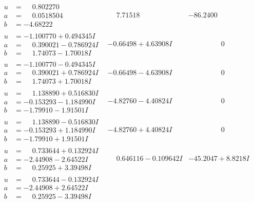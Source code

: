 \documentclass[1p]{elsarticle_modified}
\theoremstyle{definition}
\begin{document}
$$\begin{array}{c|c|c}
\begin{aligned}
u &= \phantom{-}0.802270\phantom{ +0.000000I} \\
a &= \phantom{-}0.0518504\phantom{ +0.000000I} \\
b &= -4.68222\phantom{ +0.000000I}\end{aligned}
 & \phantom{-}7.71518\phantom{ +0.000000I} & -86.2400\phantom{ +0.000000I} \\ \hline\begin{aligned}
u &= -1.100770 + 0.494345 I \\
a &= \phantom{-}0.390021 - 0.786924 I \\
b &= \phantom{-}1.74073 - 1.70018 I\end{aligned}
 & -0.66498 + 4.63908 I & \phantom{-0.000000 } 0 \\ \hline\begin{aligned}
u &= -1.100770 - 0.494345 I \\
a &= \phantom{-}0.390021 + 0.786924 I \\
b &= \phantom{-}1.74073 + 1.70018 I\end{aligned}
 & -0.66498 - 4.63908 I & \phantom{-0.000000 } 0 \\ \hline\begin{aligned}
u &= \phantom{-}1.138890 + 0.516830 I \\
a &= -0.153293 - 1.184990 I \\
b &= -1.79910 - 1.91501 I\end{aligned}
 & -4.82760 - 4.40824 I & \phantom{-0.000000 } 0 \\ \hline\begin{aligned}
u &= \phantom{-}1.138890 - 0.516830 I \\
a &= -0.153293 + 1.184990 I \\
b &= -1.79910 + 1.91501 I\end{aligned}
 & -4.82760 + 4.40824 I & \phantom{-0.000000 } 0 \\ \hline\begin{aligned}
u &= \phantom{-}0.733644 + 0.132924 I \\
a &= -2.44908 - 2.64522 I \\
b &= \phantom{-}0.25925 + 3.39498 I\end{aligned}
 & \phantom{-}0.646116 - 0.109642 I & -45.2047 + 8.8218 I \\ \hline\begin{aligned}
u &= \phantom{-}0.733644 - 0.132924 I \\
a &= -2.44908 + 2.64522 I \\
b &= \phantom{-}0.25925 - 3.39498 I\end{aligned}

\end{array}$$
\end{document}
